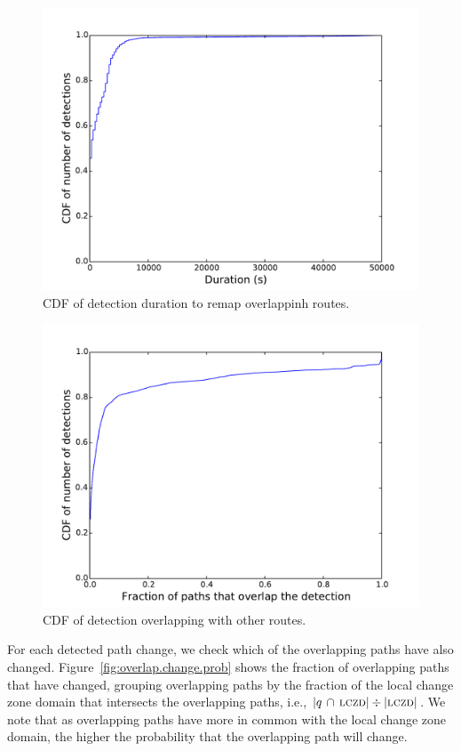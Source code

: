 \begin{figure}
\begin{center}
\includegraphics[width=0.8\columnwidth]{figs/patching/durationdetection.pdf}
\caption{CDF of detection duration to remap overlappinh routes. }
\label{fig:overlap.delay.cdf}
\end{center}
%
\end{figure}
%
\begin{figure}
\begin{center}
\includegraphics[width=0.8\columnwidth]{figs/patching/routesoverlapping.pdf}
\caption{CDF of detection overlapping with other routes.}
\label{fig:join.acc}
\end{center}
%
\end{figure}


For each detected path change, we check which of the overlapping
paths have also changed.  Figure~\ref{fig:overlap.change.prob} shows
the fraction of overlapping paths that have changed, grouping
overlapping paths by the fraction of the local change zone domain
that intersects the overlapping paths, i.e.,
$|q\,\cap\,\mathrm{\textsc{lczd}}|\div|\mathrm{\textsc{lczd}}|$.  We note that as overlapping paths
have more in common with the local change zone domain, the higher
the probability that the overlapping path will change.  


